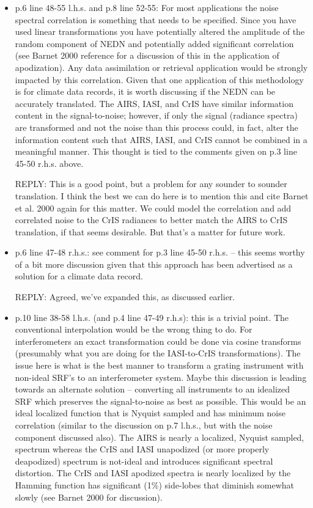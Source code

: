 \documentclass[11pt]{article}
\newcommand {\reply} {\mbox{\small REPLY}}
\begin{document}
\begin{itemize}
\item p.6 line 48-55 l.h.s. and p.8 line 52-55: For most
  applications the noise spectral correlation is something that
  needs to be specified.  Since you have used linear transformations
  you have potentially altered the amplitude of the random component
  of NEDN and potentially added significant correlation (see Barnet
  2000 reference for a discussion of this in the application of
  apodization). Any data assimilation or retrieval application would
  be strongly impacted by this correlation. Given that one
  application of this methodology is for climate data records, it is
  worth discussing if the NEDN can be accurately translated.  The
  AIRS, IASI, and CrIS have similar information content in the
  signal-to-noise; however, if only the signal (radiance spectra)
  are transformed and not the noise than this process could, in
  fact, alter the information content such that AIRS, IASI, and CrIS
  cannot be combined in a meaningful manner. This thought is tied to
  the comments given on p.3 line 45-50 r.h.s. above.

  \reply: This is a good point, but a problem for any sounder 
  to sounder translation.  I think the best we can do here is to
  mention this and cite Barnet et al. 2000 again for this matter.
  We could model the correlation and add correlated noise to the
  CrIS radiances to better match the AIRS to CrIS translation, if
  that seems desirable.  But that's a matter for future work.

\item p.6 line 47-48 r.h.s.: see comment for p.3 line 45-50 r.h.s. –
  this seems worthy of a bit more discussion given that this
  approach has been advertised as a solution for a climate data
  record.

  \reply: Agreed, we've expanded this, as discussed earlier.

\item p.10 line 38-58 l.h.s. (and p.4 line 47-49 r.h.s): this is a
  trivial point. The conventional interpolation would be the wrong
  thing to do. For interferometers an exact transformation could be
  done via cosine transforms (presumably what you are doing for the
  IASI-to-CrIS transformations). The issue here is what is the best
  manner to transform a grating instrument with non-ideal SRF’s to
  an interferometer system. Maybe this discussion is leading towards
  an alternate solution – converting all instruments to an idealized
  SRF which preserves the signal-to-noise as best as possible. This
  would be an ideal localized function that is Nyquist sampled and
  has minimum noise correlation (similar to the discussion on p.7
  l.h.s., but with the noise component discussed also). The AIRS is
  nearly a localized, Nyquist sampled, spectrum whereas the CrIS and
  IASI unapodized (or more properly deapodized) spectrum is
  not-ideal and introduces significant spectral distortion. The CrIS
  and IASI apodized spectra is nearly localized by the Hamming
  function has significant (1\%) side-lobes that diminish somewhat
  slowly (see Barnet 2000 for discussion).


\end{itemize}
\end{document}
